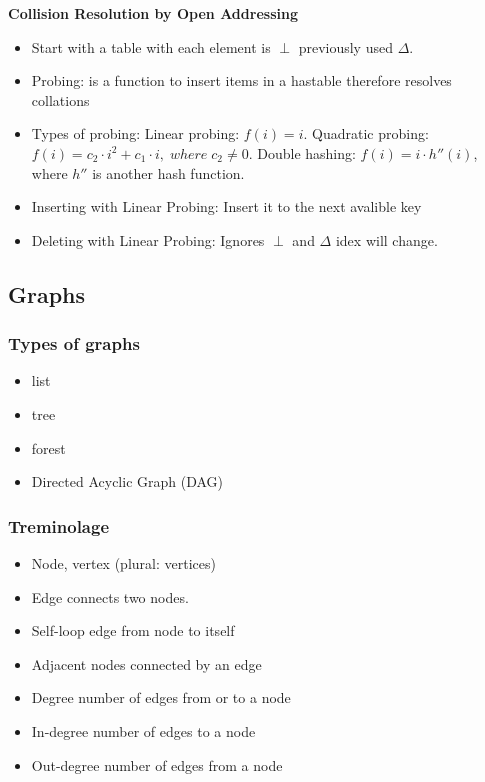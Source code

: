 \noindent\textbf{Collision Resolution by Open Addressing}
\begin{itemize}
\item Start with a table with each element is $\perp$ previously used $\Delta$.  
\item Probing: is a function to insert items in a hastable therefore resolves collations
\item Types of probing: \newline
  Linear probing: $f (i)=i$. \newline
  Quadratic probing: $f (i)=c_2\cdot i^2+c_1\cdot i, \; where \; c_2 \neq{0}$. \newline
  Double hashing: $f (i)=i\cdot h'' (i)$, where $h''$ is another hash function. \newline
\item Inserting with Linear Probing: Insert it to the next avalible key 
\item Deleting with Linear Probing: Ignores  $\perp$ and $\Delta$ idex will change.  
\end{itemize}


\newpage

\subsection{Graphs}
\subsubsection{Types of graphs}
\begin{itemize}
\item list
\item tree
\item forest
\item Directed Acyclic Graph (DAG)  
\end{itemize}

\subsubsection{Treminolage}
\begin{itemize}
\item Node, vertex (plural: vertices)
\item Edge connects two nodes.
\item Self-loop edge from node to itself
\item Adjacent nodes connected by an edge
\item Degree number of edges from or to a node
\item In-degree number of edges to a node
\item Out-degree number of edges from a node
\end{itemize}

